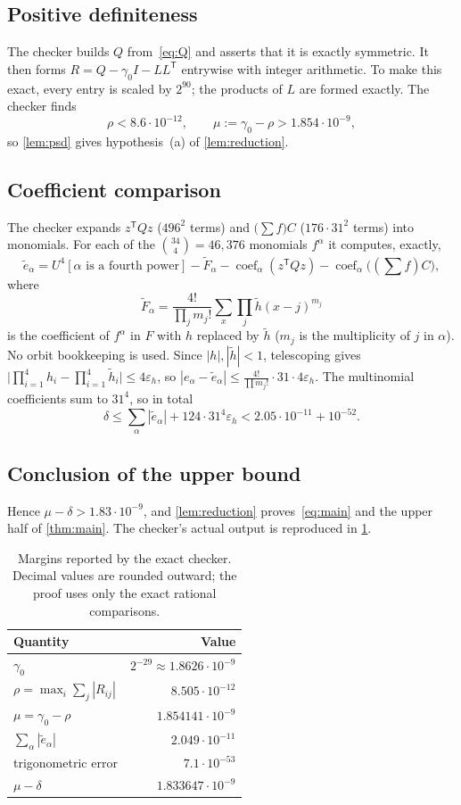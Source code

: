 \documentclass[11pt]{amsart}
\theoremstyle{definition}
\theoremstyle{remark}
\DeclareMathOperator{\coef}{coef}
\begin{document}
\subsection{Positive definiteness}
The checker builds $Q$ from~\eqref{eq:Q} and asserts that it is exactly symmetric. It then forms $R=Q-\gamma_0I-LL^{\mathsf T}$ entrywise with integer arithmetic. To make this exact, every entry is scaled by $2^{90}$; the products of $L$ are formed exactly. The checker finds
\[
  \rho<8.6\cdot10^{-12},\qquad \mu:=\gamma_0-\rho>1.854\cdot10^{-9},
\]
so \cref{lem:psd} gives hypothesis~(a) of \cref{lem:reduction}.

\subsection{Coefficient comparison}
The checker expands $z^{\mathsf T}Qz$ ($496^2$ terms) and $\bigl(\sum f\bigr)C$ ($176\cdot31^2$ terms) into monomials. For each of the $\binom{34}{4}=46{,}376$ monomials $f^\alpha$ it computes, exactly,
\[
  \tilde e_\alpha=U^4[\alpha\text{ is a fourth power}]-\tilde F_\alpha-\coef_\alpha(z^{\mathsf T}Qz)-\coef_\alpha\bigl((\textstyle\sum f)C\bigr),
\]
where
\[
  \tilde F_\alpha=\frac{4!}{\prod_j m_j!}\sum_x\prod_j\tilde h(x-j)^{m_j}
\]
is the coefficient of $f^\alpha$ in $F$ with $h$ replaced by $\tilde h$ ($m_j$ is the multiplicity of $j$ in $\alpha$). No orbit bookkeeping is used. Since $|h|,|\tilde h|<1$, telescoping gives $\bigl|\prod_{i=1}^4h_i-\prod_{i=1}^4\tilde h_i\bigr|\le4\varepsilon_h$, so $|e_\alpha-\tilde e_\alpha|\le\frac{4!}{\prod m_j!}\cdot31\cdot4\varepsilon_h$. The multinomial coefficients sum to $31^4$, so in total
\[
  \delta\le\sum_\alpha|\tilde e_\alpha|+124\cdot31^4\varepsilon_h
  <2.05\cdot10^{-11}+10^{-52}.
\]

\subsection{Conclusion of the upper bound}
Hence $\mu-\delta>1.83\cdot10^{-9}$, and \cref{lem:reduction} proves~\eqref{eq:main} and the upper half of \cref{thm:main}. The checker's actual output is reproduced in \cref{tab:margins}.

\begin{table}[ht]
\centering
\caption{Margins reported by the exact checker. Decimal values are rounded outward; the proof uses only the exact rational comparisons.}\label{tab:margins}
\begin{tabular}{@{}lr@{}}
\toprule
Quantity & Value \\
\midrule
$\gamma_0$ & $2^{-29}\approx1.8626\cdot10^{-9}$\\
$\rho=\max_i\sum_j|R_{ij}|$ & $8.505\cdot10^{-12}$\\
$\mu=\gamma_0-\rho$ & $1.854141\cdot10^{-9}$\\
$\sum_\alpha|\tilde e_\alpha|$ & $2.049\cdot10^{-11}$\\
trigonometric error & $7.1\cdot10^{-53}$\\
$\mu-\delta$ & $1.833647\cdot10^{-9}$\\
\bottomrule
\end{tabular}
\end{table}
\end{document}
